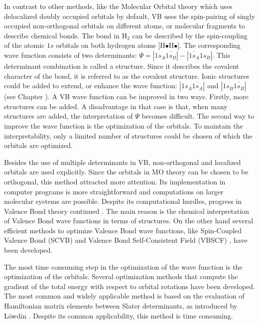 In contrast to other methods, like the Molecular Orbital theory \cite{hartree1,hartree2,hartree3,fock} which uses delocalized doubly occupied orbitals by default, 
VB uses the spin-pairing of singly occupied non-orthogonal orbitals on different atoms, or molecular fragments to describe chemical bonds. The bond in H$_2$ can be described by the spin-coupling of the atomic $1s$ orbitals on both hydrogen atoms [H$\bullet$H$\bullet$]. The corresponding wave function consists of two determinants: $\Psi = |1s_{A}\overline{1s_{B}}| - |\overline{1s_{A}}1s_{B}|$. This determinant combination is called a structure. Since it describes the covalent character of the bond, it is referred to as the covalent structure. Ionic structures could be added to extend, or enhance the wave function: $|1s_{A}\overline{1s_{A}}|$ and $|1s_{B}\overline{1s_{B}}|$ (see Chapter \chintro). A VB wave function can be improved in two ways. Firstly, more structures can be added. A disadvantage in that case is that, when many structures are added, the interpretation of $\Psi$ becomes difficult. The second way to improve the wave function is the optimization of the orbitals. To maintain the interpretability, only a limited number of structures could be chosen of which the orbitals are optimized. 

Besides the use of multiple determinants in VB, non-orthogonal and localized orbitals are used explicitly. Since the orbitals in MO theory can be chosen to be orthogonal, this method attracted more attention. Its implementation in computer programs is more straightforward and computations on larger molecular systems are possible. Despite its computational hurdles, progress in Valence Bond theory continued \cite{vboverv1,vboverv2,vboverv3}. The main reason is the chemical interpretation of Valence Bond wave functions in terms of structures. On the other hand several efficient methods to optimize Valence Bond wave functions, like Spin-Coupled Valence Bond (SCVB) \cite{scvb1,scvb2,scvb3} and Valence Bond Self-Consistent Field (VBSCF) \cite{vbscf1,vbscf2,koos1,zahid}, have been developed.

The most time consuming step in the optimization of the wave function is the optimization of the orbitals. Several optimization methods that compute the gradient of the total energy with respect to orbital rotations have been developed. The most common and widely applicable method is based on the evaluation of Hamiltonian matrix elements between Slater determinants, as introduced by L\"{o}wdin \cite{lowdin}. Despite its common applicability, this method is time consuming.


